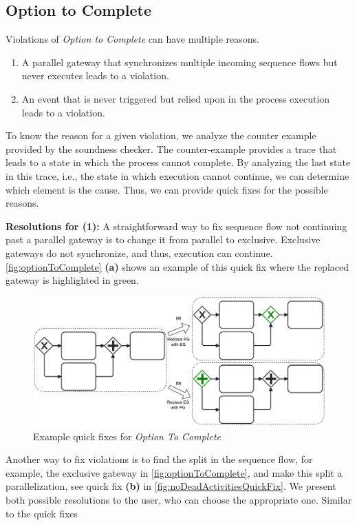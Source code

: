 \documentclass[runningheads]{llncs}
\begin{document}
\subsection{Option to Complete} \label{subsec:optionToComplete}
Violations of \textit{Option to Complete} can have multiple reasons.

\begin{enumerate}
	\item A parallel gateway that synchronizes multiple incoming sequence flows but never executes leads to a violation.
	\item An event that is never triggered but relied upon in the process execution leads to a violation.
\end{enumerate}

To know the reason for a given violation, we analyze the counter example provided by the soundness checker.
The counter-example provides a trace that leads to a state in which the process cannot complete.
By analyzing the last state in this trace, i.e., the state in which execution cannot continue, we can determine which element is the cause.
Thus, we can provide quick fixes for the possible reasons.

\textbf{Resolutions for (1):} A straightforward way to fix sequence flow not continuing past a parallel gateway is to change it from parallel to exclusive.
Exclusive gateways do not synchronize, and thus, execution can continue.
\autoref{fig:optionToComplete} \textbf{(a)} shows an example of this quick fix where the replaced gateway is highlighted in green.

\begin{figure}[ht]
	\centering
	\includegraphics[width=1\textwidth]{images/optionToComplete}
	\caption{Example quick fixes for \textit{Option To Complete}}
	\label{fig:optionToComplete}
\end{figure}

Another way to fix violations is to find the split in the sequence flow, for example, the exclusive gateway in \autoref{fig:optionToComplete}, and make this split a parallelization, see quick fix \textbf{(b)} in \autoref{fig:noDeadActivitiesQuickFix}.
We present both possible resolutions to the user, who can choose the appropriate one.
Similar to the quick fixes
\end{document}
